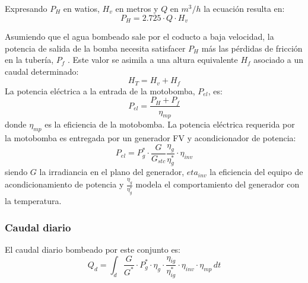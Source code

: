 Expresando \(P_H\) en watios, \(H_v\) en metros y \(Q\) en \(m^3/h\) la ecuación resulta en:
\begin{equation}
P_H=2.725\cdot Q \cdot H_v
\end{equation}

Asumiendo que el agua bombeado sale por el coducto a baja velocidad, la potencia de salida de la bomba necesita satisfacer \(P_H\)  más las pérdidas de fricción en la tubería, \(P_f\) . Este valor se asimila a una altura equivalente \(H_f\)  asociado a un caudal determinado: 
\begin{equation}
H_T=H_v+H_f
\end{equation}
La potencia eléctrica a la entrada de la motobomba, \(P_{el}\), es:
\begin{equation}
P_{el}=\frac{P_H+P_f}{\eta_{mp}} 
\end{equation}
donde \(\eta_{mp}\) es la eficiencia de la motobomba.
La potencia eléctrica requerida por la motobomba es entregada por un generador FV y acondicionador de potencia:
\begin{equation}
P_{el}=P_g^* \cdot \frac{G}{G_{stc}} \frac{\eta_g}{\eta_g^*} \cdot \eta_{inv}
\end{equation}
siendo \(G\) la irradiancia en el plano del generador, \(eta_{inv}\) la eficiencia del equipo de acondicionamiento de potencia y \(\frac{\eta_g}{\eta_g^*}\) modela el comportamiento del generador con la temperatura.

\subsubsection{Caudal diario}
\label{sec:org0c05bfd}
El caudal diario bombeado por este conjunto es:
\begin{equation}
Q_d = \int_{d} \frac{G}{G^*} \cdot P_g^* \cdot \eta_g \cdot \frac{\eta_{ig}}{\eta_{ig}^*} \cdot \eta_{inv} \cdot \eta_{mp} \, dt
\end{equation}

